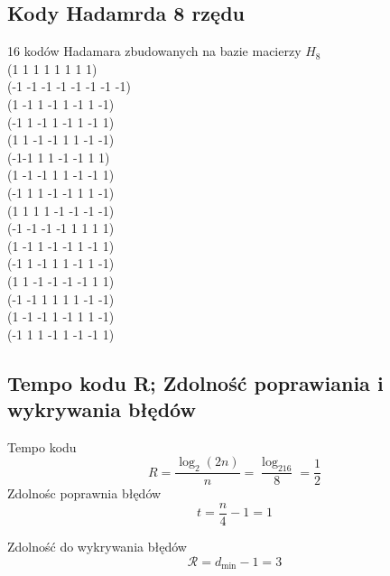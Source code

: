 \documentclass[12pt]{article}
\begin{document}
\subsection*{Kody Hadamrda 8 rzędu }

16 kodów Hadamara zbudowanych na bazie macierzy $H_8$ \\
(1 1 1 1 1 1 1 1) \\
(-1 -1 -1 -1 -1 -1 -1 -1) \\
(1 -1 1 -1 1 -1 1 -1) \\
(-1 1 -1 1 -1 1 -1 1) \\
(1 1 -1 -1 1 1 -1 -1) \\
(-1-1 1 1 -1 -1 1 1)  \\
(1 -1 -1 1 1 -1 -1 1)  \\
(-1 1 1 -1 -1 1 1 -1) \\
(1 1 1 1 -1 -1 -1 -1) \\
(-1 -1 -1 -1 1 1 1 1) \\
(1 -1 1 -1 -1 1 -1 1) \\
(-1 1 -1 1 1 -1 1 -1) \\
(1 1 -1 -1 -1 -1 1 1) \\
(-1 -1 1 1 1 1 -1 -1) \\
(1 -1 -1 1 -1 1 1 -1) \\
(-1 1 1 -1 1 -1 -1 1) \\

\subsection*{Tempo kodu R; Zdolność poprawiania i wykrywania błędów} 

Tempo kodu
$$ R = \frac{\log_2(2n)}{n} = \frac{\log_216}{8}=\frac{1}{2} $$ 
Zdolnośc poprawnia błędów
$$t=\frac{n}{4}-1=1 $$

Zdolność do wykrywania błędów
$$\mathcal{R} = d_{\min}-1 = 3$$
\end{document}
